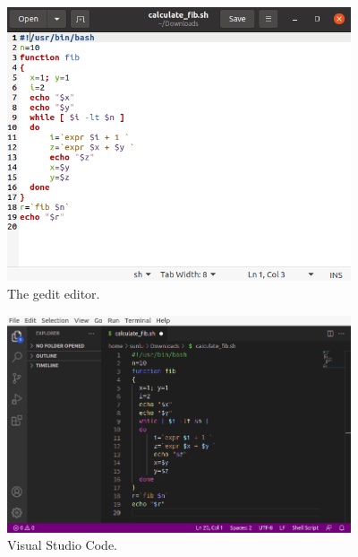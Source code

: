\begin{figure}[!htb]
	\centering
	\includegraphics[width=4in]{chapters/part-1/figures/gedit_fib.png}
	\caption{The gedit editor.}
\end{figure}

\begin{figure}[!htb]
	\centering
	\includegraphics[width=4in]{chapters/part-1/figures/vscode_fib.png}
	\caption{Visual Studio Code.}
\end{figure}
